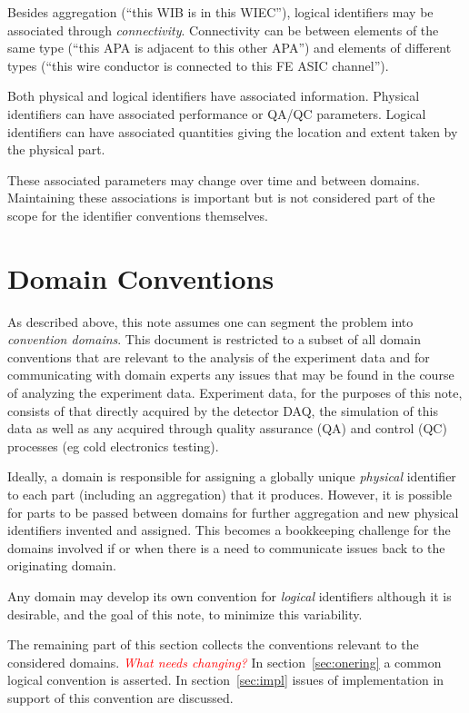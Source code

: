 \documentclass[letterpaper,twoside,onecolumn,report]{memoir}
\newcommand{\fixme}[1]{\textcolor{red}{\textit{#1}}}
\begin{document}
Besides aggregation (``this WIB is in this WIEC''), logical
identifiers may be associated through \textit{connectivity}.
Connectivity can be between elements of the same type (``this APA is
adjacent to this other APA'') and elements of different types (``this
wire conductor is connected to this FE ASIC channel'').

Both physical and logical identifiers have associated information.
Physical identifiers can have associated performance or QA/QC
parameters.  Logical identifiers can have associated quantities giving
the location and extent taken by the physical part.

These associated parameters may change over time and between domains.
Maintaining these associations is important but is not considered part
of the scope for the identifier conventions themselves.

\section{Domain Conventions}

As described above, this note assumes one can segment the problem into
\textit{convention domains}. 
This document is restricted to a subset of all domain conventions
that are relevant to the analysis of the experiment data and for
communicating with domain experts any issues that may be found in the
course of analyzing the experiment data.  Experiment data, for the
purposes of this note, consists of that directly acquired by the
detector DAQ, the simulation of this data as well as any acquired
through quality assurance (QA) and control (QC) processes (eg cold
electronics testing).

Ideally, a domain is responsible for assigning a globally unique
\textit{physical} identifier to each part (including an aggregation)
that it produces.  However, it is possible for parts to be passed
between domains for further aggregation and new physical identifiers
invented and assigned.  This becomes a bookkeeping challenge for the
domains involved if or when there is a need to communicate issues back
to the originating domain.

Any domain may develop its own convention for \textit{logical}
identifiers although it is desirable, and the goal of this note, to
minimize this variability.

The remaining part of this section collects the conventions relevant
to the considered domains.  \fixme{What needs changing?}
In section~\ref{sec:onering} a common
logical convention is asserted.  In section~\ref{sec:impl} issues of
implementation in support of this convention are discussed.
\end{document}
